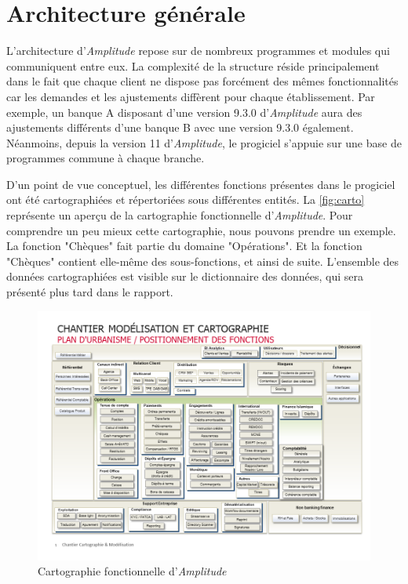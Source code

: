 \documentclass{polytech/polytech}
\begin{document}
\section{Architecture générale}
\label{sec:architectureAmplitude}

L'architecture d'\textit{Amplitude} repose sur de nombreux programmes et modules qui communiquent entre eux. La complexité de la structure réside principalement dans le fait que chaque client ne dispose pas forcément des mêmes fonctionnalités car les demandes et les ajustements diffèrent pour chaque établissement. Par exemple, un banque A disposant d'une version 9.3.0 d'\textit{Amplitude} aura des ajustements différents d'une banque B avec une version 9.3.0 également. Néanmoins, depuis la version 11 d'\textit{Amplitude}, le progiciel s'appuie sur une base de programmes commune à chaque branche. 

D'un point de vue conceptuel, les différentes fonctions présentes dans le progiciel ont été cartographiées et répertoriées sous différentes entités. La \autoref{fig:carto} représente un aperçu de la cartographie fonctionnelle d'\textit{Amplitude}. Pour comprendre un peu mieux cette cartographie, nous pouvons prendre un exemple. La fonction "Chèques" fait partie du domaine "Opérations". Et la fonction "Chèques" contient elle-même des sous-fonctions, et ainsi de suite. L'ensemble des données cartographiées est visible sur le dictionnaire des données, qui sera présenté plus tard dans le rapport. 

\begin{figure}
	\includegraphics[scale=0.62]{images/Cartographie_fonctionnelle}
	\caption{Cartographie fonctionnelle d'\textit{Amplitude}}
	\label{fig:carto}
\end{figure}
\end{document}
